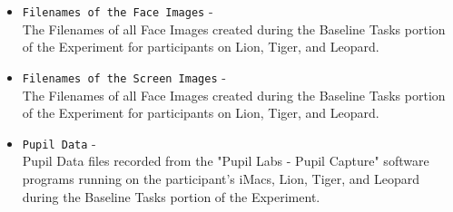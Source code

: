 \begin{description}
\begin{addmargin}[0em]{0em}
\begin{itemize}
        \item \verb|Filenames of the Face Images| -\\The Filenames of all Face Images created during the Baseline Tasks portion of the Experiment for participants on Lion, Tiger, and Leopard.
        \item \verb|Filenames of the Screen Images| -\\The Filenames of all Face Images created during the Baseline Tasks portion of the Experiment for participants on Lion, Tiger, and Leopard.
        \item \verb|Pupil Data| -\\Pupil Data files recorded from the "Pupil Labs - Pupil Capture" software programs running on the participant's iMacs, Lion, Tiger, and Leopard during the Baseline Tasks portion of the Experiment.
    \end{itemize}


\end{addmargin}
\end{description}
